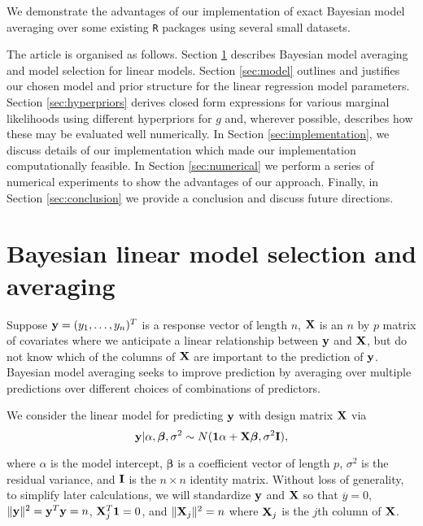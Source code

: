 \documentclass[12pt]{article}
\def\vectorfontone{\bf}
\def\vectorfonttwo{\boldsymbol}
\def\vy{{\vectorfontone y}}                      %
\def\vone{{\vectorfontone 1}}
\def\vbeta{{\vectorfonttwo \beta}}               %
\def\matrixfontone{\bf}
\def\mI{{\matrixfontone I}}                      %
\def\mX{{\matrixfontone X}}                      %
\begin{document}
\noindent 
We demonstrate the advantages of our implementation of exact Bayesian model
averaging over some existing {\tt R}
packages using several small datasets.



The article is organised as follows. Section \ref{sec:bma} describes Bayesian model averaging and model
selection for linear models. Section \ref{sec:model} outlines and justifies our chosen model and prior structure for the linear regression model parameters. Section 
\ref{sec:hyperpriors} derives closed form expressions for various marginal likelihoods using 
different hyperpriors for $g$ and, wherever possible, describes how these may be evaluated well numerically.
In Section \ref{sec:implementation}, we discuss details of our implementation which made our implementation 
computationally feasible.
In Section \ref{sec:numerical} we perform a series of numerical experiments to show the advantages of our approach. 
Finally, in Section \ref{sec:conclusion} we provide a conclusion and discuss future
directions.









 



 
 

\section{Bayesian linear model selection and averaging}
\label{sec:bma}



Suppose $\vy = (y_1,\ldots,y_n)^T$ is a response vector of length $n$, $\mX$ is an $n$ by $p$ matrix 
of covariates where we anticipate a linear relationship between $\vy$ and $\mX$, but do not know
which of the columns of $\mX$ are important to the prediction of $\vy$.
Bayesian model averaging seeks to improve prediction by averaging over multiple
predictions over different choices of combinations of predictors.

We consider the linear model for predicting $\vy$ with design matrix $\mX$ via
\begin{equation}
\label{eq:linearModel}
\vy | \alpha, \vbeta, \sigma^2 \sim N(\vone\alpha + \mX \vbeta, \sigma^2 \mI),
\end{equation} 


\noindent where $\alpha$ is the model intercept, $\vbeta$ is a coefficient vector of length $p$, 
$\sigma^2$ is the residual variance, and $\mI$ is the $n \times n$ identity matrix. 
Without loss of generality, to simplify later calculations, we will standardize $\vy$ and $\mX$ 
so that $\overline{y} = 0$, 
$\|\vy\|^2 = \vy^T\vy = n$, $\mX_j^T\vone = 0$,  and $\|\mX_j\|^2 = n$ where $\mX_j$ is the $j$th 
column of $\mX$. 
\end{document}

